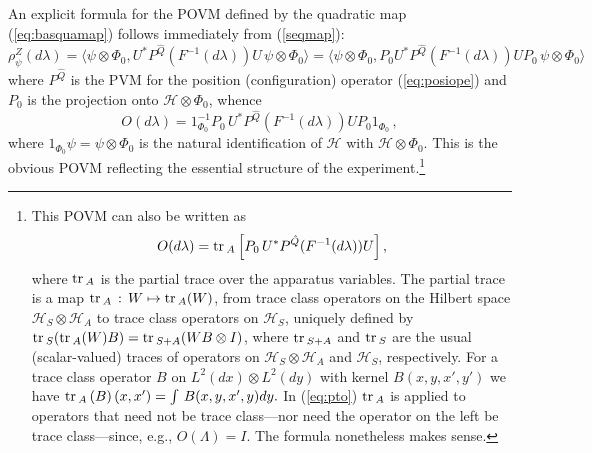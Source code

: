 \documentclass[12pt]{article}
\newcommand{\eq}[1]{(\ref{#1})}
\newcommand{\tr}{\mbox{${\rm tr}\,$}}
\newcommand{\lam}{\lambda}
\newcommand{\ot}{\otimes}
\renewcommand{\H}{\mbox{$\mathcal{H}$}}
\begin{document}
An explicit formula for the POVM defined by the quadratic map
(\ref{eq:basquamap}) follows immediately {}from (\ref{seqmap}):
$$
\rho^{Z}_{\psi}(d\lam) = \langle\psi\otimes\Phi_{0}, U^{*}
P^{\hat{Q}}(F^{-1}(d\lambda)) U\, \psi\otimes\Phi_{0}\rangle =
\langle\psi\otimes\Phi_{0}, P_0U^{*} P^{\hat{Q}}(F^{-1}(d\lambda))
UP_0\, \psi\otimes\Phi_{0}\rangle
$$
where $P^{\hat{Q}}$ is the PVM for the position (configuration)
operator (\ref{eq:posiope}) and $P_{0}$ is the projection onto
$\H\ot\Phi_{0}$, whence
\begin{equation}
O(d\lam) = 1_{\Phi_0}^{-1}
P_{0}\, U^{*} P^{\hat{Q}}(F^{-1}(d\lam)) U P_0 1_{\Phi_0}\,,
\label{eq:genpovm}
\end{equation}
where $ 1_{\Phi_0}\psi = \psi\ot\Phi_0 $ is the natural identification
of \H{} with $\H\ot\Phi_0$. This is the obvious POVM reflecting the
essential structure of the experiment.\footnote{This POVM can also be
   written as
\begin{equation}
   O(d\lam) = \tr_A\left[
P_{0}\, U^{*} P^{\hat{Q}}(F^{-1}(d\lam)) U \right],
\label{eq:pto}
\end{equation}
where $\tr_A$ is the partial trace over the apparatus variables.  The
partial trace is a map $\tr_{A}\,:\, W \mapsto \tr_{A}(W)$, {}from
trace class operators on the Hilbert space $\H_{S}\otimes\H_{A}$ to
trace class operators on $\H_{S}$, uniquely defined by $ \tr_{S} (
\tr_{A}(W) B)= \tr_{S+A} (W B\otimes I)$, where $\tr_{S+A}$ and
$\tr_{S}$ are the usual (scalar-valued) traces of operators on
$\H_{S}\otimes\H_{A}$ and $\H_{S}$, respectively.  For a trace class
operator $B$ on $L^2(dx)\otimes L^2(dy)$ with kernel $B(x,y, x',y')$
we have $\tr_{A}\left(B\right) (x,x') = \int\, B(x,y, x',y) dy .$ In
\eq{eq:pto} $\tr_A$ is applied to operators that need not be trace
class---nor need the operator on the left be trace class---since,
e.g., $O(\Lambda)= I$. The formula nonetheless makes sense.  }
\end{document}
